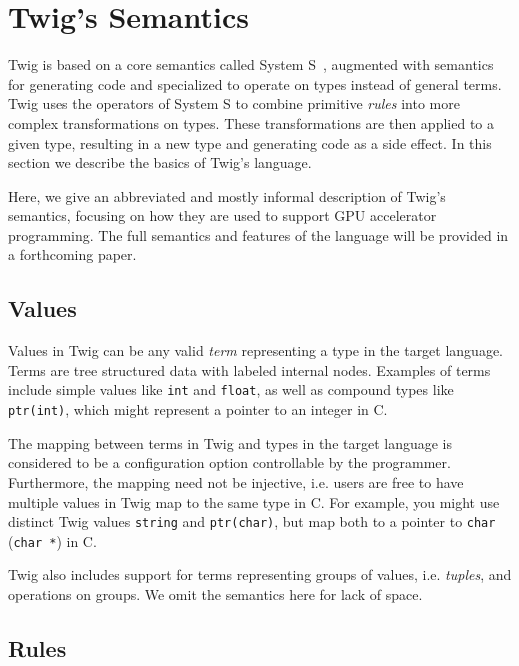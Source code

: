 
\section{Twig's Semantics}
\label{semantics}

Twig is based on a core semantics called System
S~\cite{Visser:1998p333}, augmented with semantics for generating code
and specialized to operate on types instead of general terms. Twig
uses the operators of System S to combine primitive \emph{rules} into
more complex transformations on types. These transformations are then
applied to a given type, resulting in a new type and generating code
as a side effect. In this section we describe the basics of Twig's
language.

Here, we give an abbreviated and mostly informal description of Twig's
semantics, focusing on how they are used to support GPU accelerator
programming.  The full semantics and features of the language will be
provided in a forthcoming paper.

\subsection{Values}

Values in Twig can be any valid \emph{term} representing a type in the
target language. Terms are tree structured data with labeled internal
nodes. Examples of terms include simple values like \texttt{int} and
\texttt{float}, as well as compound types like \texttt{ptr(int)},
which might represent a pointer to an integer in C.

The mapping between terms in Twig and types in the target language is
considered to be a configuration option controllable by the
programmer. Furthermore, the mapping need not be injective, i.e. users
are free to have multiple values in Twig map to the same type in
C. For example, you might use distinct Twig values \texttt{string} and
\texttt{ptr(char)}, but map both to a pointer to \texttt{char}
(\texttt{char *}) in C.

Twig also includes support for terms representing groups of values,
i.e.  \emph{tuples}, and operations on groups. We omit the semantics
here for lack of space.

\subsection{Rules}
\label{sec:rules}

